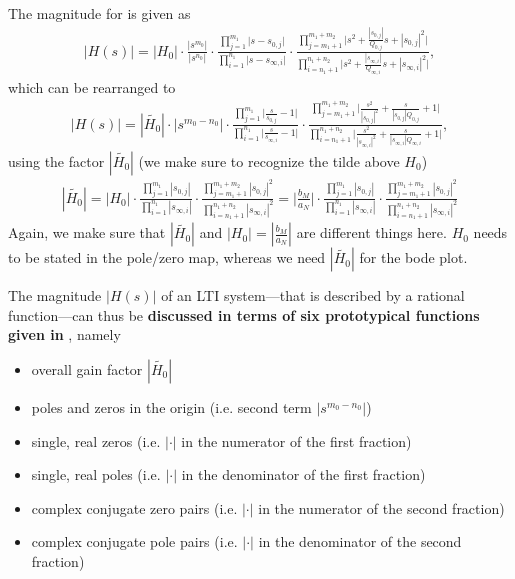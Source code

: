 The magnitude for  is given as
\begin{align}
|H(s)| = |H_0|
\cdot
\frac
{|s^{m_0}|}
{|s^{n_0}|}
\cdot
\frac
{\prod\limits_{j=1}^{m_1} \bigg|s-s_{0,j}\bigg|}
{\prod\limits_{i=1}^{n_1} \bigg|s-s_{\infty,i}\bigg|}
\cdot
\frac
{\prod\limits_{j=m_1+1}^{m_1+m_2} \bigg|s^2 + \frac{|s_{0,j}|}{Q_{0,j}} s + |s_{0,j}|^2\bigg|}
{\prod\limits_{i=n_1+1}^{n_1+n_2} \bigg|s^2 + \frac{|s_{\infty,i}|}{Q_{\infty,i}} s + |s_{\infty,i}|^2\bigg|},
\end{align}
which can be rearranged to
\begin{align}
\label{eq:Hs_sorted_for_Bode_Mag}
|H(s)| = |\tilde{H_0}|
\cdot
|s^{m_0-n_0}|
\cdot
\frac
{\prod\limits_{j=1}^{m_1} \bigg|\frac{s}{s_{0,j}}-1\bigg|}
{\prod\limits_{i=1}^{n_1} \bigg|\frac{s}{s_{\infty,i}}-1\bigg|}
\cdot
\frac
{\prod\limits_{j=m_1+1}^{m_1+m_2} \bigg|\frac{s^2}{|s_{0,j}|^2} + \frac{s}{|s_{0,j}| Q_{0,j}} + 1\bigg|}
{\prod\limits_{i=n_1+1}^{n_1+n_2} \bigg|\frac{s^2}{|s_{\infty,i}|^2} + \frac{s}{|s_{\infty,i}| Q_{\infty,i}} + 1\bigg|},
\end{align}
using the factor $|\tilde{H_0}|$ (we make sure to recognize the tilde above $H_0$)
\begin{align}
\label{eq:H0tilde}
|\tilde{H_0}| = |{H_0}|
\cdot
\frac
{\prod\limits_{j=1}^{m_1} |s_{0,j}|}
{\prod\limits_{i=1}^{n_1} |s_{\infty,i}|}
\cdot
\frac
{\prod\limits_{j=m_1+1}^{m_1+m_2} |s_{0,j}|^2}
{\prod\limits_{i=n_1+1}^{n_1+n_2} |s_{\infty,i}|^2}
= \big|\frac{b_M}{a_N}\big|
\cdot
\frac
{\prod\limits_{j=1}^{m_1} |s_{0,j}|}
{\prod\limits_{i=1}^{n_1} |s_{\infty,i}|}
\cdot
\frac
{\prod\limits_{j=m_1+1}^{m_1+m_2} |s_{0,j}|^2}
{\prod\limits_{i=n_1+1}^{n_1+n_2} |s_{\infty,i}|^2}
\end{align}
%
Again, we make sure that $|\tilde{H_0}|$ and $|{H_0}|=|\frac{b_M}{a_N}|$ are different things here.
$H_0$ needs to be stated in the pole/zero map, whereas we need $|\tilde{H_0}|$ for the bode plot.

The magnitude $|H(s)|$ of an LTI system---that is described by a rational function---can
thus be \textbf{discussed in terms of six prototypical functions given in
}, namely
\begin{itemize}
\item overall gain factor $|\tilde{H_0}|$
\item poles and zeros in the origin (i.e. second term $|s^{m_0-n_0}|$)
\item single, real zeros (i.e. $|\cdot|$ in the numerator of the first fraction)
\item single, real poles (i.e. $|\cdot|$ in the denominator of the first fraction)
\item complex conjugate zero pairs (i.e. $|\cdot|$ in the numerator of the second fraction)
\item complex conjugate pole pairs (i.e. $|\cdot|$ in the denominator of the second fraction)
\end{itemize}

